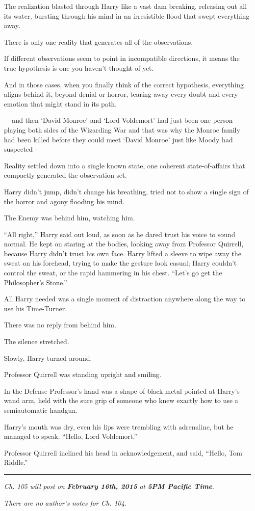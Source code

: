 The realization blasted through Harry like a vast dam breaking, releasing out all its water, bursting through his mind in an irresistible flood that swept everything away.

There is only one reality that generates all of the observations.

If different observations seem to point in incompatible directions, it means the true hypothesis is one you haven't thought of yet.

And in those cases, when you finally think of the correct hypothesis, everything aligns behind it, beyond denial or horror, tearing away every doubt and every emotion that might stand in its path.

---\,and then `David Monroe' and `Lord Voldemort' had just been one person playing both sides of the Wizarding War and that was why the Monroe family had been killed before they could meet `David Monroe' just like Moody had suspected -

Reality settled down into a single known state, one coherent state-of-affairs that compactly generated the observation set.

Harry didn't jump, didn't change his breathing, tried not to show a single sign of the horror and agony flooding his mind.

The Enemy was behind him, watching him.

``All right,'' Harry said out loud, as soon as he dared trust his voice to sound normal. He kept on staring at the bodies, looking away from Professor Quirrell, because Harry didn't trust his own face. Harry lifted a sleeve to wipe away the sweat on his forehead, trying to make the gesture look casual; Harry couldn't control the sweat, or the rapid hammering in his chest. ``Let's go get the Philosopher's Stone.''

All Harry needed was a single moment of distraction anywhere along the way to use his Time-Turner.

There was no reply from behind him.

The silence stretched.

Slowly, Harry turned around.

Professor Quirrell was standing upright and smiling.

In the Defense Professor's hand was a shape of black metal pointed at Harry's wand arm, held with the sure grip of someone who knew exactly how to use a semiautomatic handgun.

Harry's mouth was dry, even his lips were trembling with adrenaline, but he managed to speak. ``Hello, Lord Voldemort.''

Professor Quirrell inclined his head in acknowledgement, and said, ``Hello, Tom Riddle.''

\begin{center}\rule{3in}{0.4pt}\end{center}

\emph{Ch. 105 will post on \textbf{February 16th, 2015} at \textbf{5PM Pacific Time}.}

\emph{There are no author's notes for Ch. 104.}
